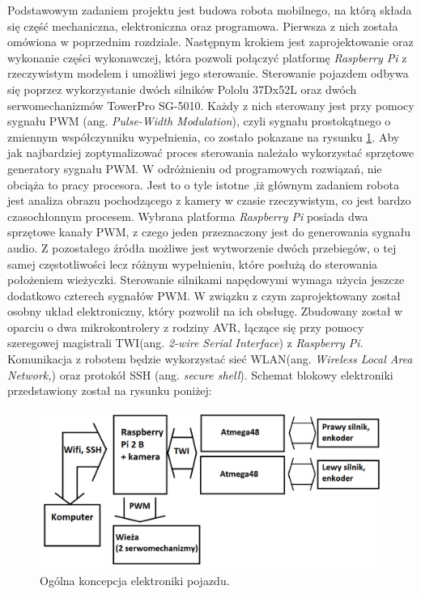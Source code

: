 Podstawowym zadaniem projektu jest budowa robota mobilnego, na którą składa się część mechaniczna, elektroniczna oraz programowa. Pierwsza z nich została omówiona w poprzednim rozdziale. Następnym krokiem jest zaprojektowanie oraz wykonanie części wykonawczej, która pozwoli połączyć platformę \textit{Raspberry Pi} z rzeczywistym modelem i umożliwi jego sterowanie. 
Sterowanie pojazdem odbywa się poprzez wykorzystanie dwóch silników Pololu 37Dx52L oraz dwóch serwomechanizmów TowerPro SG-5010. Każdy z nich sterowany jest przy pomocy sygnału PWM (ang. \textit{Pulse-Width Modulation}), czyli sygnału prostokątnego o zmiennym współczynniku wypełnienia, co zostało pokazane na rysunku \ref{sygnal_PWM}. Aby jak najbardziej zoptymalizować proces sterowania należało wykorzystać sprzętowe generatory sygnału PWM. W odróżnieniu od programowych rozwiązań, nie obciąża to pracy procesora. Jest to o tyle istotne ,iż głównym zadaniem robota jest analiza obrazu pochodzącego z kamery w czasie rzeczywistym, co jest bardzo czasochłonnym procesem. Wybrana platforma \textit{Raspberry Pi} posiada dwa sprzętowe kanały PWM, z czego jeden przeznaczony jest do generowania sygnału audio. Z pozostałego źródła możliwe jest wytworzenie dwóch przebiegów, o tej samej częstotliwości lecz różnym wypełnieniu, które posłużą do sterowania położeniem wieżyczki. Sterowanie silnikami napędowymi wymaga użycia jeszcze dodatkowo czterech sygnałów PWM. W związku z czym zaprojektowany został osobny układ elektroniczny, który pozwolił na ich obsługę. Zbudowany został w oparciu o dwa mikrokontrolery z rodziny AVR, łączące się przy pomocy szeregowej magistrali TWI(ang. \textit{2-wire Serial Interface}) z \textit{Raspberry Pi}. Komunikacja z robotem będzie wykorzystać sieć WLAN(ang. \textit{Wireless Local Area Network,}) oraz protokół SSH (ang. \textit{secure shell}). Schemat blokowy elektroniki przedstawiony został na rysunku poniżej:

  \begin{figure}[H]
    \begin{center}
      \includegraphics[scale=0.35]{imgs/idea.png}
 	\caption[Koncepcja elektroniki.]{\small{Ogólna koncepcja elektroniki pojazdu.}}
	\label{sygnal_PWM}
    \end{center}
  \end{figure}  
  

